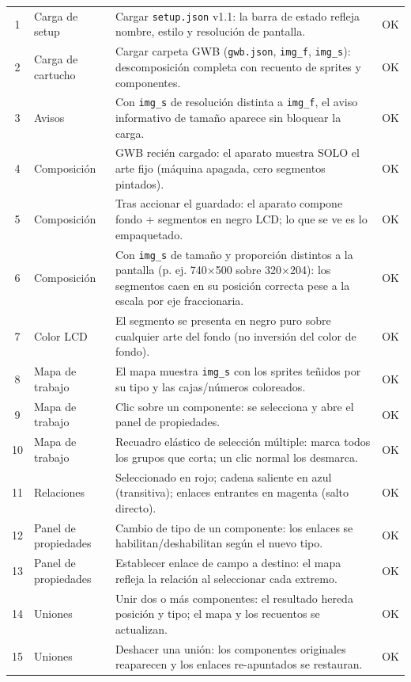 \begin{small}
\begin{tabularx}{\textwidth}{c >{\hsize}L >{\hsize}L c}
		1 & Carga de setup & Cargar \texttt{setup.json} v1.1: la barra de estado refleja nombre, estilo y resolución de pantalla. & OK \\ 
		2 & Carga de cartucho & Cargar carpeta GWB (\texttt{gwb.json}, \texttt{img\_f}, \texttt{img\_s}): descomposición completa con recuento de sprites y componentes. & OK \\ 
		3 & Avisos & Con \texttt{img\_s} de resolución distinta a \texttt{img\_f}, el aviso informativo de tamaño aparece sin bloquear la carga. & OK \\ 
		4 & Composición & GWB recién cargado: el aparato muestra SOLO el arte fijo (máquina apagada, cero segmentos pintados). & OK \\ 
		5 & Composición & Tras accionar el guardado: el aparato compone fondo + segmentos en negro LCD; lo que se ve es lo empaquetado. & OK \\ 
		6 & Composición & Con \texttt{img\_s} de tamaño y proporción distintos a la pantalla (p. ej. 740$\times$500 sobre 320$\times$204): los segmentos caen en su posición correcta pese a la escala por eje fraccionaria. & OK \\ 
		7 & Color LCD & El segmento se presenta en negro puro sobre cualquier arte del fondo (no inversión del color de fondo). & OK \\ 
		8 & Mapa de trabajo & El mapa muestra \texttt{img\_s} con los sprites teñidos por su tipo y las cajas/números coloreados. & OK \\ 
		9 & Mapa de trabajo & Clic sobre un componente: se selecciona y abre el panel de propiedades. & OK \\ 
		10 & Mapa de trabajo & Recuadro elástico de selección múltiple: marca todos los grupos que corta; un clic normal los desmarca. & OK \\ 
		11 & Relaciones & Seleccionado en rojo; cadena saliente en azul (transitiva); enlaces entrantes en magenta (salto directo). & OK \\ 
		12 & Panel de propiedades & Cambio de tipo de un componente: los enlaces se habilitan/deshabilitan según el nuevo tipo. & OK \\ 
		13 & Panel de propiedades & Establecer enlace de campo a destino: el mapa refleja la relación al seleccionar cada extremo. & OK \\ 
		14 & Uniones & Unir dos o más componentes: el resultado hereda posición y tipo; el mapa y los recuentos se actualizan. & OK \\ 
		15 & Uniones & Deshacer una unión: los componentes originales reaparecen y los enlaces re-apuntados se restauran. & OK \\ 

\end{tabularx}
\end{small}
